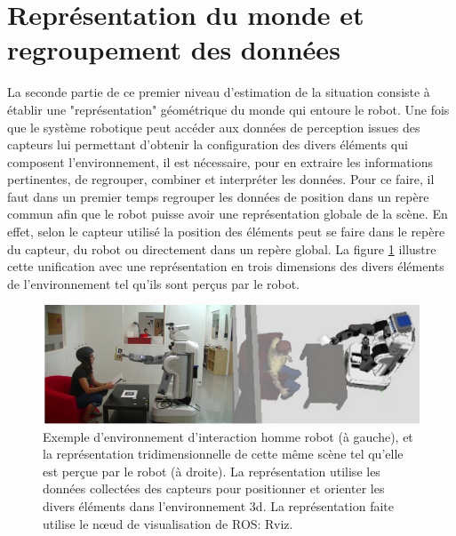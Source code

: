 \documentclass[a4paper,11pt,twoside]{StyleThese}
\begin{document}

\section{Représentation du monde et regroupement des données}
\label{sec:ws}
La seconde partie de ce premier niveau d'estimation de la situation consiste à établir une "représentation" géométrique du monde qui entoure le robot. Une fois que le système robotique peut accéder aux données de perception issues des capteurs lui permettant d'obtenir la configuration des divers éléments qui composent l'environnement, il est nécessaire, pour en extraire les informations pertinentes, de regrouper, combiner et interpréter les données. Pour ce faire, il faut dans un premier temps regrouper les données de position dans un repère commun afin que le robot puisse avoir une représentation globale de la scène. En effet, selon le capteur utilisé la position des éléments peut se faire dans le repère du capteur, du robot ou directement dans un repère global. La figure
\ref{fig:real} illustre cette unification avec une représentation en trois dimensions des divers éléments de l'environnement tel qu'ils sont perçus par le robot.


\begin{figure}[ht!]
 \centering
  \includegraphics[width=0.99\linewidth]{./img/real2.jpg} 
  \caption {Exemple d'environnement d'interaction homme robot (à gauche), et la représentation tridimensionnelle de cette même scène tel qu'elle est perçue par le robot (à droite). La représentation utilise les données collectées des capteurs pour positionner et orienter les divers éléments dans l'environnement 3d. La représentation faite utilise le nœud de visualisation de ROS: Rviz.}
  \label{fig:real}
\end{figure}
\end{document}
